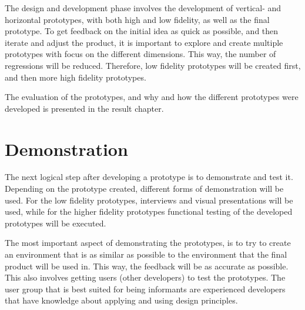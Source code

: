 \documentclass{report}
\begin{document}
The design and development phase involves the development of vertical- and horizontal prototypes, with both high and low fidelity, as well as the final prototype. To get feedback on the initial idea as quick as possible, and then iterate and adjust the product, it is important to explore and create multiple prototypes with focus on the different dimensions. This way, the number of regressions will be reduced. Therefore, low fidelity prototypes will be created first, and then more high fidelity prototypes.

The evaluation of the prototypes, and why and how the different prototypes were developed is presented in the result chapter. 

\section{Demonstration}

The next logical step after developing a prototype is to demonstrate and test it. Depending on the prototype created, different forms of demonstration will be used. For the low fidelity prototypes, interviews and visual presentations will be used, while for the higher fidelity prototypes functional testing of the developed prototypes will be executed. 

The most important aspect of demonstrating the prototypes, is to try to create an environment that is as similar as possible to the environment that the final product will be used in. This way, the feedback will be as accurate as possible. This also involves getting users (other developers) to test the prototypes. The user group that is best suited for being informants are experienced developers that have knowledge about applying and using design principles.

\end{document}
